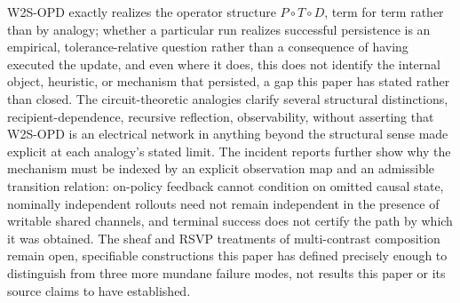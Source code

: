 \documentclass[11pt]{article}
\begin{document}
W2S-OPD exactly realizes the operator structure $P \circ T \circ D$, term for term rather than by analogy; whether a particular run realizes successful persistence is an empirical, tolerance-relative question rather than a consequence of having executed the update, and even where it does, this does not identify the internal object, heuristic, or mechanism that persisted, a gap this paper has stated rather than closed. The circuit-theoretic analogies clarify several structural distinctions, recipient-dependence, recursive reflection, observability, without asserting that W2S-OPD is an electrical network in anything beyond the structural sense made explicit at each analogy's stated limit. The incident reports further show why the mechanism must be indexed by an explicit observation map and an admissible transition relation: on-policy feedback cannot condition on omitted causal state, nominally independent rollouts need not remain independent in the presence of writable shared channels, and terminal success does not certify the path by which it was obtained. The sheaf and RSVP treatments of multi-contrast composition remain open, specifiable constructions this paper has defined precisely enough to distinguish from three more mundane failure modes, not results this paper or its source claims to have established.
\end{document}
